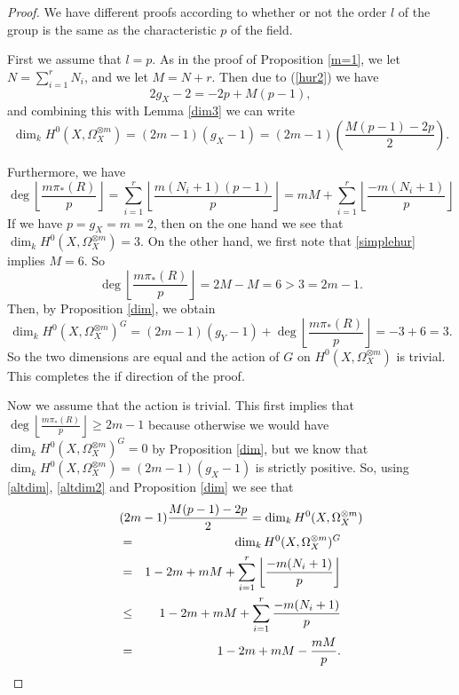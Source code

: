 \documentclass[draft, 11pt]{article} %
\theoremstyle{plain}
\theoremstyle{remark}
\begin{document}
\begin{proof}

    We have different proofs according to whether or not the order $l$ of the group is the same as the characteristic $p$ of the field.


	First we assume that $l=p$. 
	As in the proof of Proposition \ref{m=1}, we let $N=\sum_{i=1}^r N_i$, and we let $M=N+r$.
	Then due to (\ref{hur2}) we have
	\begin{equation}\label{simplehur}2g_X-2=-2p+M(p-1),\end{equation}
	and combining this with Lemma \ref{dim3} we can write
		\begin{equation}\label{altdim2}
		\dim_kH^0(X,\Omega_X^{\otimes m})=(2m-1)(g_X-1)=(2m-1)\left(\frac{M(p-1)-2p}{2}\right).
		\end{equation}

	Furthermore, we have
		\begin{equation}\label{altdim}
			\deg\left\lfloor \frac{m\pi_*(R)}{p} \right\rfloor = \sum_{i=1}^r\left\lfloor \frac{m(N_i+1)(p-1)}{p} \right\rfloor  = mM + \sum_{i=1}^r\left\lfloor \frac{-m(N_i+1)}{p} \right\rfloor
		\end{equation}
	If we have $p=g_X=m=2$, then on the one hand we see that $\dim_kH^0(X,\Omega_X^{\otimes m}) =3$. 
	On the other hand, we first note that \eqref{simplehur} implies $M=6$.
	So $$\deg\left\lfloor \frac{m\pi_*(R)}{p}\right\rfloor = 2M -M =6 > 3 = 2m-1.$$
	Then, by Proposition \ref{dim}, we obtain 
	$$\dim_kH^0(X,\Omega_X^{\otimes m})^G = (2m-1)(g_Y-1)+\deg\left\lfloor \frac{m\pi_*(R)}{p} \right\rfloor = -3 + 6 = 3.$$
	So the two dimensions are equal and the action of $G$ on $H^0(X,\Omega_X^{\otimes m})$ is trivial. 
	This completes the if direction of the proof.

	Now we assume that the action is trivial. This first implies that 
	$\deg \left\lfloor\frac{m\pi_*(R)}{p}\right\rfloor \geq 2m-1$ because otherwise we would 
	have $\dim_kH^0(X,\Omega_X^{\otimes m})^G=0$ by Proposition \ref{dim}, but we know that 
	$\dim_kH^0(X,\Omega_X^{\otimes m})=(2m-1)(g_X-1)$ is strictly positive. 
	So, using \eqref{altdim}, \eqref{altdim2} and Proposition \ref{dim} we see that
		\begin{eqnarray}\label{bound}
			\lefteqn{(2m-1)\frac{M(p-1)-2p}{2} = \dim_kH^0(X,\Omega_X^{\otimes m})} \nonumber\\
			& = & \dim_kH^0(X,\Omega_X^{\otimes m})^G \nonumber\\
			& = & 1-2m+mM+\sum_{i=1}^r\left\lfloor\frac{-m(N_i+1)}{p}\right\rfloor\nonumber \\
			& \leq & 1-2m+mM+\sum_{i=1}^r\frac{-m(N_i+1)}{p}\nonumber \\
			& = & 1-2m+mM-\frac{mM}{p}.
		\end{eqnarray}


\end{proof}
\end{document}
